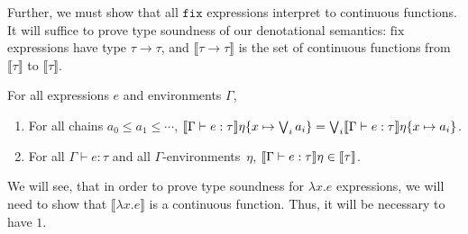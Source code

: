 Further, we must show that all $\texttt{fix}$ expressions interpret to continuous functions. It will suffice to prove type
soundness of our denotational semantics: $\text{fix}$ expressions have type $\tau \rightarrow \tau$, and 
$\llbracket \tau \rightarrow \tau \rrbracket$ is the set of continuous functions from $\llbracket \tau \rrbracket$ to
$\llbracket \tau \rrbracket$. 

\begin{thm} 
For all expressions $e$ and environments $\Gamma$,
\begin{enumerate}
\item For all chains $a_0\leq a_1\leq\dotsb$,
$\llbracket{{\Gamma}\vdash{e}:{\tau}}\rrbracket{\eta\{{x}\mapsto{\bigvee_i a_i}\}} =
\bigvee_i\llbracket{{\Gamma}\vdash{e}:{\tau}}\rrbracket{\eta\{{x}\mapsto{a_i}\}}$.
\item For all $\Gamma\vdash e : \tau$ and all $\Gamma$-environments~$\eta$,
$\llbracket{{\Gamma}\vdash{e}:{\tau}}\rrbracket{\eta}\in\llbracket{\tau}\rrbracket$.
\end{enumerate}
\end{thm}
We will see, that in order to prove type soundness for $\lambda x.e$ expressions, we will need to show that 
$\llbracket \lambda x.e \rrbracket$ is a continuous function. Thus, it will be necessary to have $1$.
